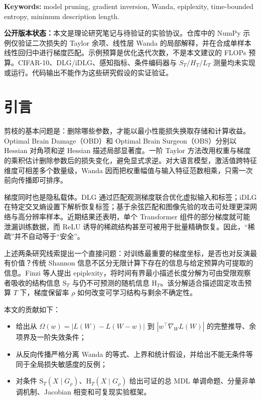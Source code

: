 \documentclass[conference,a4paper]{IEEEtran}
\newcommand{\ST}{\mathrm{S}_{T}}
\newcommand{\HT}{\mathrm{H}_{T}}
\begin{document}
\noindent\textbf{Keywords:} model pruning, gradient inversion, Wanda, epiplexity, time-bounded entropy, minimum description length.

\noindent\textbf{公开版本状态：}本文是理论研究笔记与待验证的实验协议。仓库中的 NumPy 示例仅验证二次损失的 Taylor 余项、线性层 Wanda 的局部解释，并在合成单样本线性回归中进行梯度匹配。示例预算是优化迭代次数，不是本文建议的 FLOPs 预算。CIFAR-10、DLG/iDLG、感知指标、条件编码器与 $S_T/H_T/L_T$ 测量均未实现或运行。代码输出不能作为这些研究假设的实证验证。

\section{引言}

剪枝的基本问题是：删除哪些参数，才能以最小性能损失换取存储和计算收益。Optimal Brain Damage（OBD）和 Optimal Brain Surgeon（OBS）分别以 Hessian 对角项和逆 Hessian 描述局部显著度\cite{lecun1989obd,hassibi1993obs}。一阶 Taylor 方法改用权重与梯度的乘积估计删除参数后的损失变化，避免显式求逆\cite{molchanov2019importance}。对大语言模型，激活值跨特征维度可相差多个数量级\cite{sun2024massive}，Wanda 因而把权重幅值与输入特征范数相乘，只需一次前向传播即可排序\cite{sun2024wanda}。

梯度同时也是隐私载体。DLG 通过匹配观测梯度联合优化虚拟输入和标签\cite{zhu2019dlg}；iDLG 在特定交叉熵设置下解析恢复标签\cite{zhao2020idlg}；基于余弦匹配和图像先验的攻击可处理更深网络与高分辨率样本\cite{geiping2020inverting,yin2021gradinversion}。近期结果还表明，单个 Transformer 组件的部分梯度就可能泄漏训练数据\cite{li2024partial}，而 ReLU 诱导的稀疏结构甚至可被用于批量精确恢复\cite{dimitrov2024spear}。因此，“稀疏”并不自动等于“安全”。

上述两条研究线索提出一个直接问题：对训练最重要的梯度坐标，是否也对反演最有价值？传统 Shannon 信息不区分无限计算下存在的信息与给定预算内可提取的信息。Finzi 等人提出 epiplexity，将时间有界最小描述长度分解为可由受限观察者吸收的结构信息 $\ST$ 与仍不可预测的随机信息 $\HT$\cite{finzi2026epiplexity}。该分解适合描述固定攻击预算 $T$ 下，梯度保留率 $\rho$ 如何改变可学习结构与剩余不确定性。

本文的贡献如下：
\begin{itemize}
  \item 给出从 $\Omega(w)=|L(W)-L(W-w)|$ 到 $|w^\top\nabla_WL(W)|$ 的完整推导、余项界及一阶失效条件；
  \item 从反向传播严格分离 Wanda 的等式、上界和统计假设，并给出不能无条件等同于全局损失敏感度的反例；
  \item 对条件 $\ST(X\mid G_\rho)$、$\HT(X\mid G_\rho)$ 给出可证的总 MDL 单调命题、分量非单调机制、Jacobian 相变和可复现实验框架。
\end{itemize}
\end{document}
